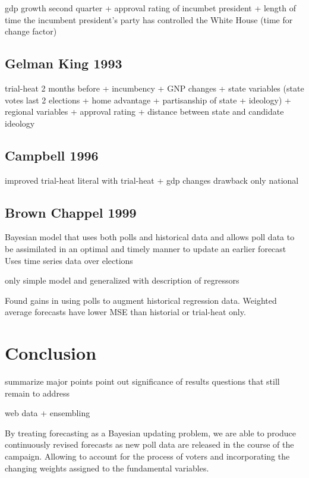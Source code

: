 \documentclass[
  12pt]{article}
\begin{document}
gdp growth second quarter + approval rating of incumbet president +
length of time the incumbent president's party has controlled the White
House (time for change factor)

\hypertarget{gelman-king-1993}{%
\subsection{Gelman King 1993}\label{gelman-king-1993}}

trial-heat 2 months before + incumbency + GNP changes + state variables
(state votes last 2 elections + home advantage + partisanship of state +
ideology) + regional variables + approval rating + distance between
state and candidate ideology

\hypertarget{campbell-1996}{%
\subsection{Campbell 1996}\label{campbell-1996}}

improved trial-heat literal with trial-heat + gdp changes drawback only
national

\hypertarget{brown-chappel-1999}{%
\subsection{Brown Chappel 1999}\label{brown-chappel-1999}}

Bayesian model that uses both polls and historical data and allows poll
data to be assimilated in an optimal and timely manner to update an
earlier forecast Uses time series data over elections

only simple model and generalized with description of regressors

Found gains in using polls to augment historical regression data.
Weighted average forecasts have lower MSE than historial or trial-heat
only.

\hypertarget{sec-conc}{%
\section{Conclusion}\label{sec-conc}}

\addtolength{\textheight}{.5in}%

summarize major points point out significance of results questions that
still remain to address

web data + ensembling

By treating forecasting as a Bayesian updating problem, we are able to
produce continuously revised forecasts as new poll data are released in
the course of the campaign. Allowing to account for the process of
voters and incorporating the changing weights assigned to the
fundamental variables.
\end{document}

